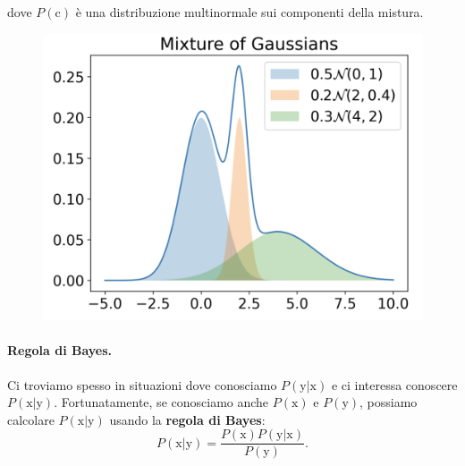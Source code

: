 dove $P(\text{c})$ è una distribuzione multinormale sui componenti della mistura.
\begin{figure}[!h]
    \includegraphics[scale=.6]{images/prerequisites/mixture.png}
    \centering
\end{figure}
\paragraph{Regola di Bayes.} Ci troviamo spesso in situazioni dove conosciamo $P(\text{y|x})$ e ci interessa conoscere $P(\text{x|y})$. Fortunatamente, se conosciamo anche $P(\text{x})$ e $P(\text{y})$, possiamo calcolare $P(\text{x|y})$ usando la \textbf{regola di Bayes}:
\begin{equation}
    P(\text{x$|$y})=\frac{P(\text{x})P(\text{y$|$x})}{P(\text{y})}.
\end{equation}




